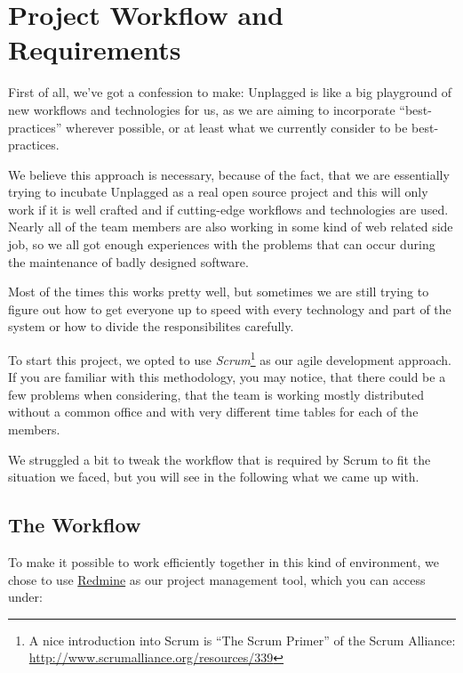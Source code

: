 \chapter{Project Workflow and  Requirements}
\label{chap:systemRequirements}

First of all, we've got a confession to make: Unplagged is like a big playground of new 
workflows and technologies for us, as we are aiming to incorporate 
\enquote{best-practices} wherever possible, or at least what we currently consider to be best-practices. 

We believe this approach is necessary, because of the 
fact, that we are essentially trying to incubate Unplagged as a real open source project and this will 
only work if
it is well crafted and if cutting-edge workflows and technologies are used. Nearly all of the team members
are also working in some kind of web related side job, so we all got enough experiences with the problems that can 
occur during the maintenance of badly designed software.

Most of the times this works pretty well, but sometimes we are still trying to figure out how to 
get everyone up to speed with every technology and part of the system or how to divide the responsibilites carefully.

To start this project, we opted to use \textit{Scrum}\footnote{A nice introduction into Scrum is \enquote{The Scrum Primer} 
of the Scrum Alliance: \url{http://www.scrumalliance.org/resources/339}} 
as our agile development approach. If you are familiar with this
methodology, you may notice, that there could be a few problems when considering, that the team is working mostly 
distributed
without a common office and with very different time tables for each of the members.

We struggled a bit to tweak the workflow that is required by Scrum to fit the situation we faced, but you will see in the
following what we came up with.

\section{The Workflow}

To make it possible to work efficiently together in this kind of environment, we chose to use
\href{http://www.redmine.org/}{Redmine} as our project management tool, which you can access under:

